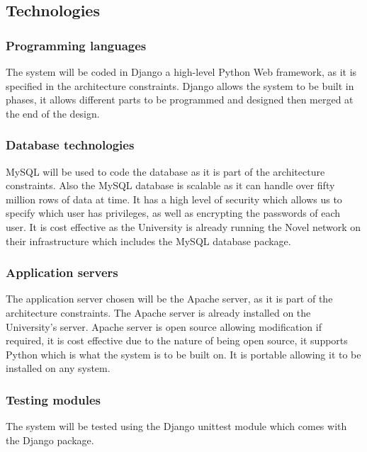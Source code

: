 \topmargin=-0.45in
\evensidemargin=0in
\oddsidemargin=0in
\textwidth=6.5in
\textheight=9.0in
\headsep=0.25in

\linespread{1.1} %
\subsection{Technologies}
\subsubsection{Programming languages}

The system will be coded in Django a high-level Python Web framework, as it is specified in the architecture constraints. Django allows the system to be built in phases, it allows different parts to be programmed and designed then merged at the end of the design. 

\subsubsection{Database technologies}

MySQL will be used to code the database as it is part of the architecture constraints. Also the MySQL database is scalable as it can handle over fifty million rows of data at time. It has a high level of security which allows us to specify which user has privileges, as well as encrypting the passwords of each user. It is cost effective as the University is already running the Novel network on their infrastructure which includes the MySQL database package. 

\subsubsection{Application servers}

The application server chosen will be the Apache server, as it is part of the architecture constraints. The Apache server is already installed on the University's server. Apache server is open source allowing modification if required, it is cost effective due to the nature of being open source, it supports Python which is what the system is to be built on. It is portable allowing it to be installed on any system.

\subsubsection{Testing modules}

The system will be tested using the Django unittest  module which comes with the Django package.

